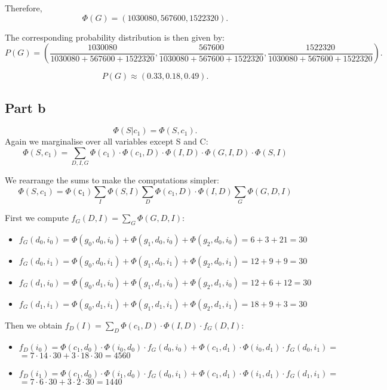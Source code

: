 \documentclass[11pt,a4paper]{article}
\begin{document}
	Therefore, $$ \Phi(G) = (1030080, 567600, 1522320). $$
	
	The corresponding probability distribution is then given by:
	$$ P(G) = (\frac{1030080}{1030080 + 567600 + 1522320}, \frac{567600}{1030080 + 567600 + 1522320}, \frac{1522320}{1030080 + 567600 + 1522320}). $$
	
	$$ P(G) \approx (0.33, 0.18, 0.49). $$
	
\subsection*{Part b}
	$$ \Phi(S | c_1) = \Phi(S, c_1).$$
	Again we marginalise over all variables except S and C:
	$$ \Phi(S, c_1) = \sum_{D, I, G} \Phi(c_1) \cdot \Phi(c_1, D) \cdot \Phi(I, D) \cdot \Phi(G, I, D) \cdot \Phi(S, I)  $$
	
	We rearrange the sums to make the computations simpler:
	 $$ \Phi(S, c_1) = \Phi(с_1) \sum_I \Phi(S, I) \sum_D \Phi(c_1, D) \cdot \Phi(I, D) \sum_G \Phi(G, D, I) $$
	 
	 First we compute  $ f_G(D, I) = \sum_G \Phi(G, D, I):$
	 \begin{itemize}
	 	\item $ f_G(d_0, i_0) = \Phi(g_0, d_0, i_0) + \Phi(g_1, d_0, i_0) + \Phi(g_2, d_0, i_0) = 6 + 3 + 21 = 30$
 		\item $ f_G(d_0, i_1) = \Phi(g_0, d_0, i_1) + \Phi(g_1, d_0, i_1) + \Phi(g_2, d_0, i_1) = 12 + 9 + 9 = 30$
		\item $ f_G(d_1, i_0) = \Phi(g_0, d_1, i_0) + \Phi(g_1, d_1, i_0) + \Phi(g_2, d_1, i_0) = 12 + 6 + 12 = 30$
		\item $ f_G(d_1, i_1) = \Phi(g_0, d_1, i_1) + \Phi(g_1, d_1, i_1) + \Phi(g_2, d_1, i_1) = 18 + 9 + 3 = 30$
	 \end{itemize}
	 
	 Then we obtain $f_D(I) = \sum_D \Phi(c_1, D) \cdot \Phi(I, D) \cdot f_G(D, I):$
	 \begin{itemize}
	 	\item $f_D(i_0) = \Phi(c_1, d_0) \cdot \Phi(i_0, d_0) \cdot f_G(d_0, i_0) + \Phi(c_1, d_1) \cdot \Phi(i_0, d_1) \cdot f_G(d_0, i_1) = $ \\
	 	$ = 7 \cdot 14 \cdot 30 + 3 \cdot 18 \cdot 30 = 4560 $
	 	\item $f_D(i_1) = \Phi(c_1, d_0) \cdot \Phi(i_1, d_0) \cdot f_G(d_0, i_1) + \Phi(c_1, d_1) \cdot \Phi(i_1, d_1) \cdot f_G(d_1, i_1) = $ \\
	 	$ = 7 \cdot 6 \cdot 30 + 3 \cdot 2 \cdot 30 = 1440 $
	 \end{itemize}
	 
\end{document}
